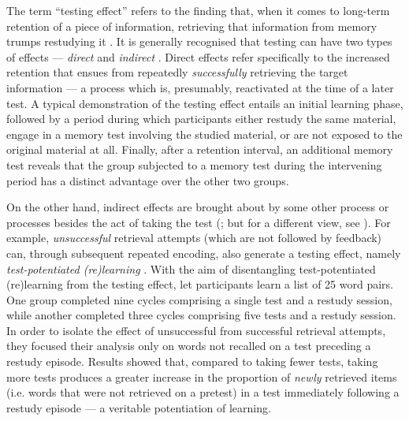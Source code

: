 \documentclass[../main.tex]{subfiles}
\begin{document}
The term ``testing effect'' refers to the finding that, when it comes to long-term retention of a piece of information, retrieving that information from memory trumps restudying it \citep{karpickeCriticalImportanceRetrieval2008,roedigeriiiPowerTestingMemory2006, roedigeriiiTestEnhancedLearningTaking2006, rowlandEffectTestingRestudy2014, adesopeRethinkingUseTests2017, roedigeriiiCriticalRoleRetrieval2011, gloverTestingPhenomenonNot1989}. It is generally recognised that testing can have two types of effects --- \textit{direct} and \textit{indirect} \citep{arnoldTestpotentiatedLearningDistinguishing2013, roedigeriiiPowerTestingMemory2006}. Direct effects refer specifically to the increased retention that ensues from repeatedly \textit{successfully} retrieving the target information --- a process which is, presumably, reactivated at the time of a later test. A typical demonstration of the testing effect entails an initial learning phase, followed by a period during which participants either restudy the same material, engage in a memory test involving the studied material, or are not exposed to the original material at all. Finally, after a retention interval, an additional memory test reveals that the group subjected to a memory test during the intervening period has a distinct advantage over the other two groups. 

On the other hand, indirect effects are brought about by some other process or 
processes besides the act of taking the test 
(\citealp{roedigeriiiPowerTestingMemory2006}; but for a different view, see 
\citealp{kornellRetrievalAttemptsEnhance2015}). For example, 
\textit{unsuccessful} retrieval attempts (which are not followed by feedback) 
can, through subsequent repeated encoding, also generate a testing effect, 
namely \textit{test-potentiated (re)learning} 
\citep{izawaReinforcementTestSequencesPairedAssociate1966,izawaOptimalPotentiatingEffects1970,
 kornellUnsuccessfulRetrievalAttempts2009, arnoldFreeRecallEnhances2013, 
arnoldTestpotentiatedLearningDistinguishing2013, 
wissmanTestpotentiatedLearningThree2018}. With the aim of disentangling 
test-potentiated (re)learning from the testing effect, 
\cite{arnoldTestpotentiatedLearningDistinguishing2013} let participants learn a 
list of 25 word pairs. One group completed nine cycles comprising a single test 
and a restudy session, while another completed three cycles comprising five 
tests and a restudy session. In order to isolate the effect of unsuccessful 
from successful retrieval attempts, they focused their analysis only on words 
not recalled on a test preceding a restudy episode. Results showed that, 
compared to taking fewer tests, taking more tests produces a greater increase 
in the proportion of \textit{newly} retrieved items (i.e. words that were not 
retrieved on a pretest) in a test immediately following a restudy episode --- a 
veritable potentiation of learning.
\end{document}
